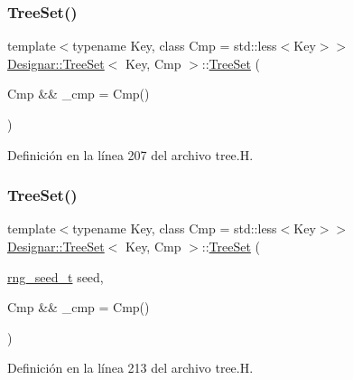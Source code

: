 \subsubsection{\texorpdfstring{Tree\+Set()}{TreeSet()}\hspace{0.1cm}{\footnotesize\ttfamily [3/7]}}
{\footnotesize\ttfamily template$<$typename Key, class Cmp = std\+::less$<$\+Key$>$$>$ \\
\hyperlink{class_designar_1_1_tree_set}{Designar\+::\+Tree\+Set}$<$ Key, Cmp $>$\+::\hyperlink{class_designar_1_1_tree_set}{Tree\+Set} (\begin{DoxyParamCaption}\item[{Cmp \&\&}]{\+\_\+cmp = {\ttfamily Cmp()} }\end{DoxyParamCaption})\hspace{0.3cm}{\ttfamily [inline]}}



Definición en la línea 207 del archivo tree.\+H.

\mbox{\label{class_designar_1_1_tree_set_a18b64c4f5ac3d0a4eb4d4e242ea4b4df}} 
\subsubsection{\texorpdfstring{Tree\+Set()}{TreeSet()}\hspace{0.1cm}{\footnotesize\ttfamily [4/7]}}
{\footnotesize\ttfamily template$<$typename Key, class Cmp = std\+::less$<$\+Key$>$$>$ \\
\hyperlink{class_designar_1_1_tree_set}{Designar\+::\+Tree\+Set}$<$ Key, Cmp $>$\+::\hyperlink{class_designar_1_1_tree_set}{Tree\+Set} (\begin{DoxyParamCaption}\item[{\hyperlink{namespace_designar_ad621b5646d45288c5d6a1e1dfe7531a8}{rng\+\_\+seed\+\_\+t}}]{seed,  }\item[{Cmp \&\&}]{\+\_\+cmp = {\ttfamily Cmp()} }\end{DoxyParamCaption})\hspace{0.3cm}{\ttfamily [inline]}}



Definición en la línea 213 del archivo tree.\+H.

\mbox{\label{class_designar_1_1_tree_set_adca348df928acd414db780df7ba541c1}} 
